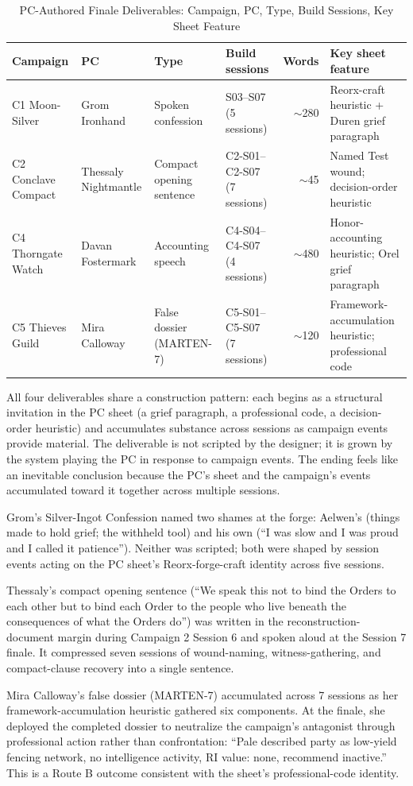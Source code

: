 \begin{table}[t]
\centering
\caption{PC-Authored Finale Deliverables: Campaign, PC, Type, Build Sessions, Key Sheet Feature}
\label{tab:deliverables}
\begin{tabular}{@{}llllrp{3.5cm}@{}}
\toprule
Campaign & PC & Type & Build sessions & Words & Key sheet feature \\
\midrule
C1 Moon-Silver & Grom Ironhand & Spoken confession & S03--S07 (5 sessions) & $\sim$280
  & Reorx-craft heuristic + Duren grief paragraph \\
C2 Conclave Compact & Thessaly Nightmantle & Compact opening sentence & C2-S01--C2-S07 (7 sessions) & $\sim$45
  & Named Test wound; decision-order heuristic \\
C4 Thorngate Watch & Davan Fostermark & Accounting speech & C4-S04--C4-S07 (4 sessions) & $\sim$480
  & Honor-accounting heuristic; Orel grief paragraph \\
C5 Thieves Guild & Mira Calloway & False dossier (MARTEN-7) & C5-S01--C5-S07 (7 sessions) & $\sim$120
  & Framework-accumulation heuristic; professional code \\
\bottomrule
\end{tabular}
\end{table}

All four deliverables share a construction pattern: each begins as a structural
invitation in the PC sheet (a grief paragraph, a professional code, a decision-order
heuristic) and accumulates substance across sessions as campaign events provide
material. The deliverable is not scripted by the designer; it is grown by the system
playing the PC in response to campaign events. The ending feels like an inevitable
conclusion because the PC's sheet and the campaign's events accumulated toward it
together across multiple sessions.

Grom's Silver-Ingot Confession named two shames at the forge: Aelwen's (things made
to hold grief; the withheld tool) and his own (``I was slow and I was proud and I
called it patience''). Neither was scripted; both were shaped by session events acting
on the PC sheet's Reorx-forge-craft identity across five sessions.

Thessaly's compact opening sentence (``We speak this not to bind the Orders to each
other but to bind each Order to the people who live beneath the consequences of what
the Orders do'') was written in the reconstruction-document margin during Campaign 2
Session 6 and spoken aloud at the Session 7 finale. It compressed seven sessions of
wound-naming, witness-gathering, and compact-clause recovery into a single sentence.

Mira Calloway's false dossier (MARTEN-7) accumulated across 7 sessions as her
framework-accumulation heuristic gathered six components. At the finale, she deployed
the completed dossier to neutralize the campaign's antagonist through professional
action rather than confrontation: ``Pale described party as low-yield fencing network,
no intelligence activity, RI value: none, recommend inactive.'' This is a Route B
outcome consistent with the sheet's professional-code identity.
